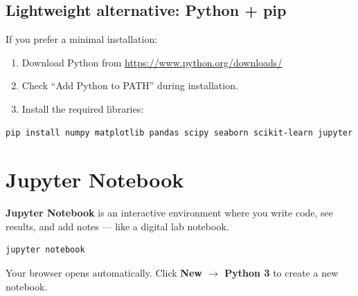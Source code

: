 \subsection*{Lightweight alternative: Python + pip}

If you prefer a minimal installation:
\begin{enumerate}
\item Download Python from \url{https://www.python.org/downloads/}
\item Check ``Add Python to PATH'' during installation.
\item Install the required libraries:
\end{enumerate}

\begin{codeblock}[title=\textbf{Terminal}]
\begin{verbatim}
pip install numpy matplotlib pandas scipy seaborn scikit-learn jupyter
\end{verbatim}
\end{codeblock}

\section*{Jupyter Notebook}

\textbf{Jupyter Notebook} is an interactive environment where you write code, see results, and add notes --- like a digital lab notebook.

\begin{codeblock}[title=\textbf{Terminal --- Launch Jupyter}]
\begin{verbatim}
jupyter notebook
\end{verbatim}
\end{codeblock}

Your browser opens automatically. Click \textbf{New $\to$ Python 3} to create a new notebook.

\begin{center}
\end{center}

